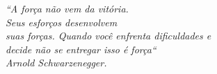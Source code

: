 \begin{epigrafe}
    \vspace*{\fill}
	\begin{flushright}
	\textit{``A força não vem da vitória.\\ Seus esforços desenvolvem\\
		suas forças. Quando você enfrenta dificuldades e\\ decide não se entregar
		isso é força`` \\
		Arnold Schwarzenegger.}
	\end{flushright}
\end{epigrafe}
